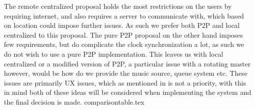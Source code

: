 The remote centralized proposal holds the most restrictions on the users by requiring internet, and also requires a server to communicate with, which based on location could impose further issues.
As such we prefer both \ac{P2P} and local centralized to this proposal.
The pure \ac{P2P} proposal on the other hand imposes few requirements, but do complicate the clock synchronization a lot, as such we do not wish to use a pure \ac{P2P} implementation.
This leaves us with local centralized or a modified version of \ac{P2P}, a particular issue with a rotating master however, would be how do we provide the music source, queue system etc.
These issues are primarily \ac{UX} issues, which as mentioned in  is not a priority, with this in mind both of these ideas will be considered when implementing the system and the final decision is made.
{comparisontable.tex}

